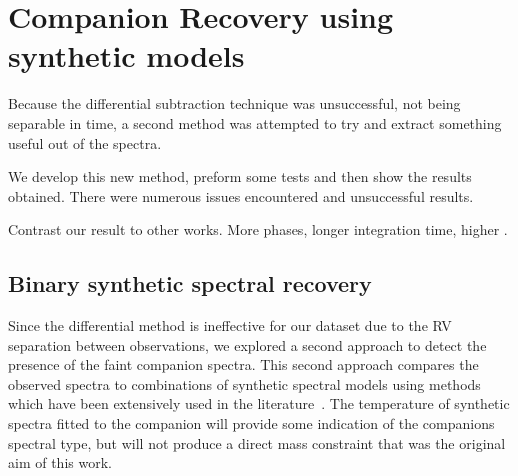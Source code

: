 

\chapter{Companion Recovery using synthetic models}  %
\label{cha:model_comparison}

Because the differential subtraction technique was unsuccessful, not being separable in time, a second method was attempted to try and extract something useful out of the spectra.

We develop this new method, preform some tests and then show the results obtained.
There were numerous issues encountered and unsuccessful results.

Contrast our result to other works.  More phases, longer integration time, higher {\snr{}}.




\section{Binary synthetic spectral recovery}
\label{subsec:companion_recovery}
Since the differential method is ineffective for our dataset due to the {RV} separation between observations, we explored a second approach to detect the presence of the faint companion spectra.
This second approach compares the observed spectra to combinations of synthetic spectral models using \textchisquared{} methods which have been extensively used in the literature~\citep[e.g.][]{astudillo-defru_harps_2015, passegger_fundamental_2016, zechmeister_spectrum_2018, nemravova_xtauri_2016, kolbl_detection_2015}. {\red{} The temperature of synthetic spectra fitted to the companion will provide some indication of the companions spectral type, but will not produce a direct mass constraint that was the original aim of this work.}

